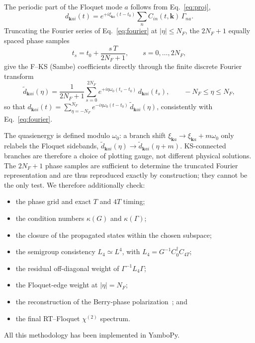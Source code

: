 \documentclass{iopjournal}
\begin{document}
The periodic part of the Floquet mode $a$ follows from Eq.~\ref{eq:proj},
\begin{equation}
  d_{\mathbf k a i}(t) = e^{+i\xi_{\mathbf k a}(t-t_0)} \sum_n C_{in}(t,\mathbf k)\,\Gamma_{na}.
  \label{eq:periodic_part}
\end{equation}
Truncating the Fourier series of Eq.~\ref{eq:fourier} at $|\eta|\le N_F$, the $2N_F+1$
equally spaced phase samples
\begin{equation}
  t_s = t_0 + \frac{s\,T}{2N_F+1}, \qquad s = 0,\dots,2N_F,
  \label{eq:phase_grid}
\end{equation}
give the F--KS (Sambe) coefficients directly through the finite discrete Fourier transform
\begin{equation}
  \tilde d_{\mathbf k a i}(\eta) = \frac{1}{2N_F+1}\sum_{s=0}^{2N_F}
  e^{+i\eta\omega_0(t_s-t_0)}\, d_{\mathbf k a i}(t_s),
  \qquad -N_F\le\eta\le N_F ,
  \label{eq:dft}
\end{equation}
so that $d_{\mathbf k a i}(t)=\sum_{\eta=-N_F}^{N_F} e^{-i\eta\omega_0(t-t_0)}\,\tilde d_{\mathbf k a i}(\eta)$,
consistently with Eq.~\ref{eq:fourier}.

The quasienergy is defined modulo $\omega_0$: a branch shift
$\xi_{\mathbf k a}\to\xi_{\mathbf k a}+m\omega_0$ only relabels the Floquet sidebands,
$\tilde d_{\mathbf k a i}(\eta)\to\tilde d_{\mathbf k a i}(\eta+m)$. KS-connected branches are
therefore a choice of plotting gauge, not different physical solutions.
The $2N_F+1$ phase samples are sufficient to determine the truncated Fourier representation and
are thus reproduced exactly by construction; they cannot be the only test. We therefore
additionally check:
\begin{itemize}
\item the phase grid and exact $T$ and $4T$ timing;
\item the condition numbers $\kappa(G)$ and $\kappa(\Gamma)$;
\item the closure of the propagated states within the chosen subspace;
\item the semigroup consistency $L_4\simeq L^4$, with $L_4=G^{-1}C_0^\dagger C_{4T}$;
\item the residual off-diagonal weight of $\Gamma^{-1}L_4\Gamma$;
\item the Floquet-edge weight at $|\eta|=N_F$;
\item the reconstruction of the Berry-phase polarization~\cite{Souza2004,Attaccalite2013}; and
\item the final RT--Floquet $\chi^{(2)}$ spectrum.
\end{itemize}
All this methodology has been implemented in YamboPy\cite{YamboPy}.
\end{document}
